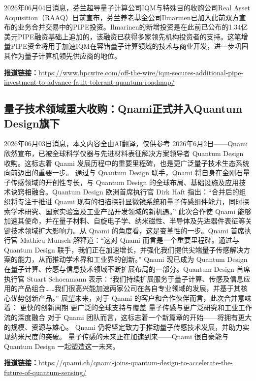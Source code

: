 \documentclass[12pt,a4paper]{ctexart}
\begin{document}
2026年06月04日消息，芬兰超导量子计算公司IQM与特殊目的收购公司Real Asset Acquisition（RAAQ）日前宣布，芬兰养老基金公司Ilmarinen已加入此前双方宣布的业务合并交易中的PIPE投资。Ilmarinen的新增投资是在此前已公布的1.34亿美元PIPE融资基础上追加的，该融资已获得多家领先机构投资者的支持。这笔增量PIPE资金将用于加速IQM在容错量子计算领域的技术与商业开发，进一步巩固其作为量子计算机领先供应商的地位。

\noindent\textbf{报道链接：}\url{https://www.hpcwire.com/off-the-wire/iqm-secures-additional-pipe-investment-to-advance-fault-tolerant-quantum-roadmap/}

\subsection{ 量子技术领域重大收购：Qnami正式并入Quantum Design旗下 }

2026年06月03日消息，本文内容全由AI翻译，仅供参考
2026年6月2日——Qnami 欣然宣布，已被全球科学仪器与先进材料表征解决方案领导者 Quantum Design 收购。这标志着 Qnami 发展历程中的重要里程碑，也是更广泛量子技术生态系统向前迈出的重要一步。
通过与 Quantum Design 联手，Qnami 将自身在金刚石量子传感领域的开创性专长，与 Quantum Design 的全球布局、基础设施及应用技术诀窍相融合。Quantum Design 欧洲首席执行官 Dirk Haft 指出：“合并后的组织将专注于推进 Qnami 现有的扫描探针显微镜系统和量子传感组件能力，同时探索学术研究、国家实验室及工业产品开发领域的新机遇。”
此次合作使 Qnami 能够加速其使命，并在量子材料、自旋电子学、纳米磁性、半导体及先进器件表征等关键技术领域扩大影响力。从 Qnami 的角度看，这是变革性的一步。Qnami 首席执行官 Mathieu Munsch 解释道：“这对 Qnami 而言是一个重要里程碑。通过与 Quantum Design 联手，我们正在加速增长，并强化我们提供尖端量子传感解决方案的能力，从而推动学术界和工业界的创新。”
Qnami 现已成为 Quantum Design 在量子计算、传感与信息技术领域不断扩展布局的一部分。Quantum Design 首席执行官 Stuart Schoenmann 表示：“我们持续扩展服务于量子计算、传感及信息应用的产品组合……我们很高兴能加速两家公司在各自专业领域的发展，并基于其核心优势创新产品。”
展望未来，对于 Qnami 的客户和合作伙伴而言，此次合并意味着：
更快的创新周期
更广泛的全球支持与覆盖
量子传感与更广泛研究和工业工作流的深度融合
对于 Qnami 团队而言，这标志着一个新篇章的开始——将拥有更大的规模、资源与雄心。
Qnami 仍将坚定致力于推动量子传感技术发展，并助力实现纳米尺度的突破。
量子传感的未来正在加速到来——Qnami 很自豪能与 Quantum Design 一起塑造这一未来。

\noindent\textbf{报道链接：}\url{https://qnami.ch/qnami-joins-quantum-design-to-accelerate-the-future-of-quantum-sensing/}
\end{document}
